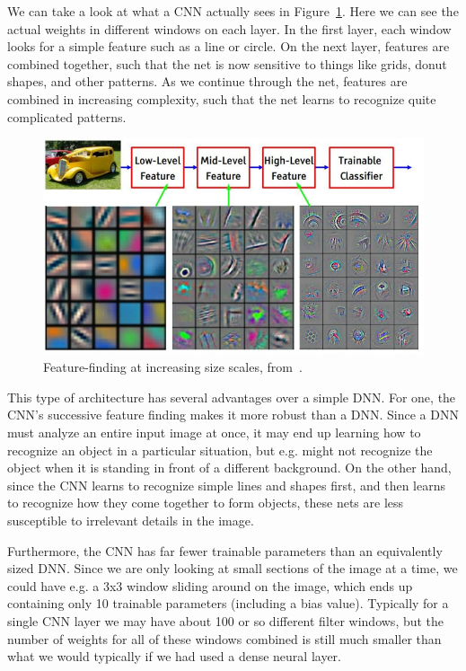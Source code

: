 We can take a look at what a CNN actually sees in Figure~\ref{fig:CNN_features}. Here we can see the actual weights in different windows on each layer. In the first layer, each window looks for a simple feature such as a line or circle. On the next layer, features are combined together, such that the net is now sensitive to things like grids, donut shapes, and other patterns. As we continue through the net, features are combined in increasing complexity, such that the net learns to recognize quite complicated patterns.

\begin{figure}[htbp]
    \centering
    \includegraphics[width=\linewidth]{Images/ML/CNN_features.png}
    \caption{Feature-finding at increasing size scales, from~\cite{CNN_features}.}
    \label{fig:CNN_features}
\end{figure}

This type of architecture has several advantages over a simple DNN. For one, the CNN's successive feature finding makes it more robust than a DNN. Since a DNN must analyze an entire input image at once, it may end up learning how to recognize an object in a particular situation, but e.g. might not recognize the object when it is standing in front of a different background. On the other hand, since the CNN learns to recognize simple lines and shapes first, and then learns to recognize how they come together to form objects, these nets are less susceptible to irrelevant details in the image.

Furthermore, the CNN has far fewer trainable parameters than an equivalently sized DNN. Since we are only looking at small sections of the image at a time, we could have e.g. a 3x3 window sliding around on the image, which ends up containing only 10 trainable parameters (including a bias value). Typically for a single CNN layer we may have about 100 or so different filter windows, but the number of weights for all of these windows combined is still much smaller than what we would typically if we had used a dense neural layer.

